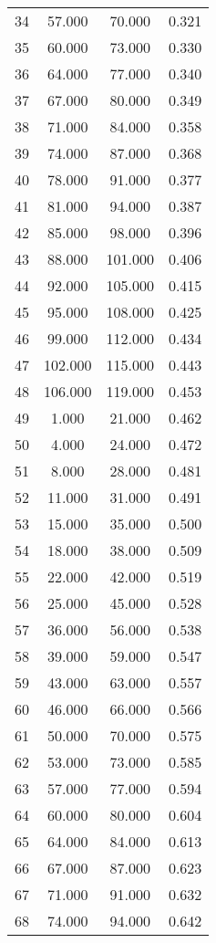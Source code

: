 \begin{tabular}{cccc}
  34 & 57.000 & 70.000 & 0.321 \\ 
  35 & 60.000 & 73.000 & 0.330 \\ 
  36 & 64.000 & 77.000 & 0.340 \\ 
  37 & 67.000 & 80.000 & 0.349 \\ 
  38 & 71.000 & 84.000 & 0.358 \\ 
  39 & 74.000 & 87.000 & 0.368 \\ 
  40 & 78.000 & 91.000 & 0.377 \\ 
  41 & 81.000 & 94.000 & 0.387 \\ 
  42 & 85.000 & 98.000 & 0.396 \\ 
  43 & 88.000 & 101.000 & 0.406 \\ 
  44 & 92.000 & 105.000 & 0.415 \\ 
  45 & 95.000 & 108.000 & 0.425 \\ 
  46 & 99.000 & 112.000 & 0.434 \\ 
  47 & 102.000 & 115.000 & 0.443 \\ 
  48 & 106.000 & 119.000 & 0.453 \\ 
  49 & 1.000 & 21.000 & 0.462 \\ 
  50 & 4.000 & 24.000 & 0.472 \\ 
  51 & 8.000 & 28.000 & 0.481 \\ 
  52 & 11.000 & 31.000 & 0.491 \\ 
  53 & 15.000 & 35.000 & 0.500 \\ 
  54 & 18.000 & 38.000 & 0.509 \\ 
  55 & 22.000 & 42.000 & 0.519 \\ 
  56 & 25.000 & 45.000 & 0.528 \\ 
  57 & 36.000 & 56.000 & 0.538 \\ 
  58 & 39.000 & 59.000 & 0.547 \\ 
  59 & 43.000 & 63.000 & 0.557 \\ 
  60 & 46.000 & 66.000 & 0.566 \\ 
  61 & 50.000 & 70.000 & 0.575 \\ 
  62 & 53.000 & 73.000 & 0.585 \\ 
  63 & 57.000 & 77.000 & 0.594 \\ 
  64 & 60.000 & 80.000 & 0.604 \\ 
  65 & 64.000 & 84.000 & 0.613 \\ 
  66 & 67.000 & 87.000 & 0.623 \\ 
  67 & 71.000 & 91.000 & 0.632 \\ 
  68 & 74.000 & 94.000 & 0.642 \\ 

\end{tabular}
